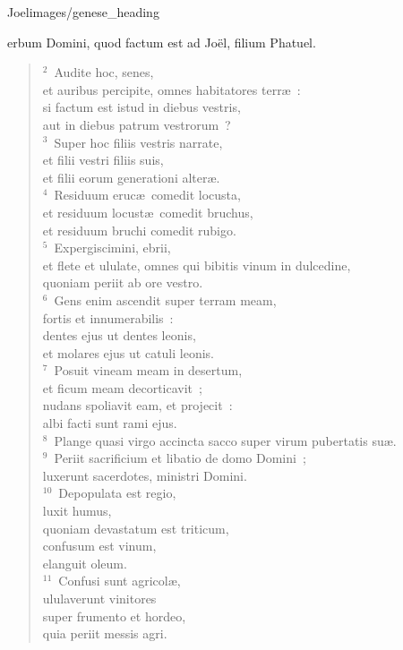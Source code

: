 {Joel}{images/genese_heading}


\bchapter
{}erbum Domini, quod factum est ad Jo\"el, filium Phatuel.
\begin{verse}\vspace{6pt}${}^{2}$~Audite hoc, senes,\\ et auribus percipite, omnes habitatores terr\ae~:\\ si factum est istud in diebus vestris,\\ aut in diebus patrum vestrorum~?\\
${}^{3}$~Super hoc filiis vestris narrate,\\ et filii vestri filiis suis,\\ et filii eorum generationi alter\ae .\\
${}^{4}$~Residuum eruc\ae\ comedit locusta,\\ et residuum locust\ae\ comedit bruchus,\\ et residuum bruchi comedit rubigo.\\
${}^{5}$~Expergiscimini, ebrii,\\ et flete et ululate, omnes qui bibitis vinum in dulcedine,\\ quoniam periit ab ore vestro.\\
${}^{6}$~Gens enim ascendit super terram meam,\\ fortis et innumerabilis~:\\ dentes ejus ut dentes leonis,\\ et molares ejus ut catuli leonis.\\
${}^{7}$~Posuit vineam meam in desertum,\\ et ficum meam decorticavit~;\\ nudans spoliavit eam, et projecit~:\\ albi facti sunt rami ejus.\\
${}^{8}$~Plange quasi virgo accincta sacco super virum pubertatis su\ae .\\
${}^{9}$~Periit sacrificium et libatio de domo Domini~;\\ luxerunt sacerdotes, ministri Domini.\\
${}^{10}$~Depopulata est regio,\\ luxit humus,\\ quoniam devastatum est triticum,\\ confusum est vinum,\\ elanguit oleum.\\
${}^{11}$~Confusi sunt agricol\ae ,\\ ululaverunt vinitores\\ super frumento et hordeo,\\ quia periit messis agri.\\

\end{verse}
